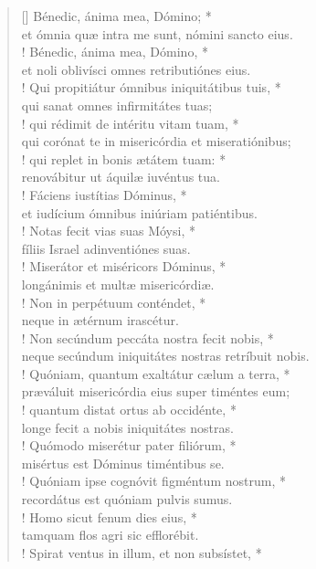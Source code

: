 \begin{verse}[\versewidth]
Bénedic, ánima mea, Dómino; *\\
et ómnia quæ intra me sunt, nómini sancto eius.\\!
\vin Bénedic, ánima mea, Dómino, *\\
\vin et noli oblivísci omnes retributiónes eius.\\!
Qui propitiátur ómnibus iniquitátibus tuis, *\\
qui sanat omnes infirmitátes tuas;\\!
\vin qui rédimit de intéritu vitam tuam, *\\
\vin qui corónat te in misericórdia et miseratiónibus;\\!
qui replet in bonis ætátem tuam: *\\
renovábitur ut áquilæ iuvéntus tua.\\!
\vin Fáciens iustítias Dóminus, *\\
\vin et iudícium ómnibus iniúriam patiéntibus.\\!
Notas fecit vias suas Móysi, *\\
fíliis Israel adinventiónes suas.\\!
\vin Miserátor et miséricors Dóminus, *\\
\vin longánimis et multæ misericórdiæ.\\!
Non in perpétuum conténdet, *\\
neque in ætérnum irascétur.\\!
\vin Non secúndum peccáta nostra fecit nobis, *\\
\vin neque secúndum iniquitátes nostras retríbuit nobis.\\!
Quóniam, quantum exaltátur cælum a terra, *\\
præváluit misericórdia eius super timéntes eum;\\!
\vin quantum distat ortus ab occidénte, *\\
\vin longe fecit a nobis iniquitátes nostras.\\!
Quómodo miserétur pater filiórum, *\\
misértus est Dóminus timéntibus se.\\!
\vin Quóniam ipse cognóvit figméntum nostrum, *\\
\vin recordátus est quóniam pulvis sumus.\\!
Homo sicut fenum dies eius, *\\
tamquam flos agri sic efflorébit.\\!
\vin Spirat ventus in illum, et non subsístet, *\\

\end{verse}
